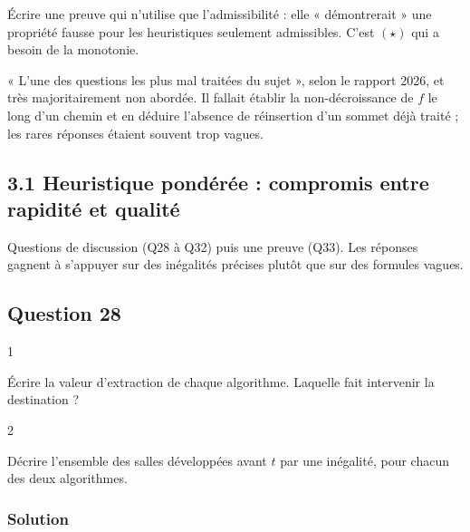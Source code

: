 \documentclass[11pt,a4paper]{article}
\begin{document}
\begin{piege}

Écrire une preuve qui n'utilise que l'admissibilité : elle « démontrerait » une propriété fausse pour les heuristiques seulement admissibles. C'est \((\star)\) qui a besoin de la monotonie.

\end{piege}

\begin{jury}

« L'une des questions les plus mal traitées du sujet », selon le rapport 2026, et très majoritairement non abordée. Il fallait établir la non-décroissance de \(f\) le long d'un chemin et en déduire l'absence de réinsertion d'un sommet déjà traité ; les rares réponses étaient souvent trop vagues.

\end{jury}

\hypertarget{heuristique-ponduxe9ruxe9e-compromis-entre-rapidituxe9-et-qualituxe9}{%
\subsection{3.1 Heuristique pondérée : compromis entre rapidité et qualité}\label{heuristique-ponduxe9ruxe9e-compromis-entre-rapidituxe9-et-qualituxe9}}

Questions de discussion (Q28 à Q32) puis une preuve (Q33). Les réponses gagnent à s'appuyer sur des inégalités précises plutôt que sur des formules vagues.

\hypertarget{question-28}{%
\subsection{Question 28}\label{question-28}}

\begin{indication}{1}

Écrire la valeur d'extraction de chaque algorithme. Laquelle fait intervenir la destination ?

\end{indication}

\begin{indication}{2}

Décrire l'ensemble des salles développées avant \(t\) par une inégalité, pour chacun des deux algorithmes.

\end{indication}

\hypertarget{solution-27}{%
\subsubsection{Solution}\label{solution-27}}
\end{document}
